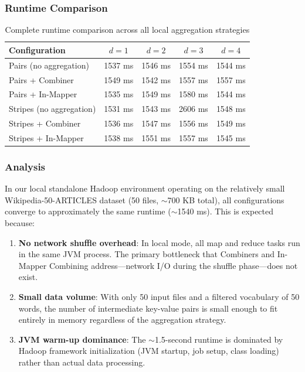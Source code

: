\documentclass[12pt,a4paper]{article}
\begin{document}
\subsubsection{Runtime Comparison}
\begin{table}[H]
  \centering
  \begin{tabular}{@{}lcccc@{}}
    \toprule
    \textbf{Configuration} & $d=1$ & $d=2$ & $d=3$ & $d=4$ \\
    \midrule
    Pairs (no aggregation)          & 1537 ms & 1546 ms & 1554 ms & 1544 ms \\
    Pairs + Combiner                & 1549 ms & 1542 ms & 1557 ms & 1557 ms \\
    Pairs + In-Mapper               & 1535 ms & 1549 ms & 1580 ms & 1544 ms \\
    \midrule
    Stripes (no aggregation)        & 1531 ms & 1543 ms & 2606 ms & 1548 ms \\
    Stripes + Combiner              & 1536 ms & 1547 ms & 1556 ms & 1549 ms \\
    Stripes + In-Mapper             & 1538 ms & 1551 ms & 1557 ms & 1545 ms \\
    \bottomrule
  \end{tabular}
  \caption{Complete runtime comparison across all local aggregation strategies}
\end{table}

\subsubsection{Analysis}
In our local standalone Hadoop environment operating on the relatively small Wikipedia-50-ARTICLES dataset (50 files, $\sim$700 KB total), all configurations converge to approximately the same runtime ($\sim$1540 ms). This is expected because:
\begin{enumerate}
  \item \textbf{No network shuffle overhead}: In local mode, all map and reduce tasks run in the same JVM process. The primary bottleneck that Combiners and In-Mapper Combining address---network I/O during the shuffle phase---does not exist.
  \item \textbf{Small data volume}: With only 50 input files and a filtered vocabulary of 50 words, the number of intermediate key-value pairs is small enough to fit entirely in memory regardless of the aggregation strategy.
  \item \textbf{JVM warm-up dominance}: The $\sim$1.5-second runtime is dominated by Hadoop framework initialization (JVM startup, job setup, class loading) rather than actual data processing.
\end{enumerate}
\end{document}
